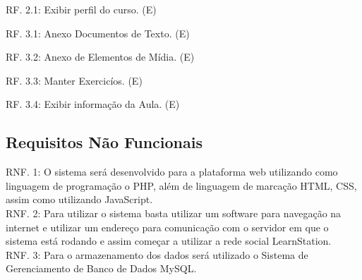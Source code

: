 \documentclass[12pt,a4paper,onecolumn,titlepage]{article}
\begin{document}
RF. 2.1: Exibir perfil do curso. (E)


RF. 3.1: Anexo Documentos de Texto. (E)

RF. 3.2: Anexo de Elementos de Mídia. (E)

RF. 3.3: Manter Exercicíos. (E)

RF. 3.4: Exibir informação da Aula. (E)

\subsection{Requisitos Não Funcionais}

RNF. 1: O sistema será desenvolvido para a plataforma web utilizando como linguagem de programação o PHP, além de linguagem de marcação HTML, CSS, assim como utilizando JavaScript.\\

RNF. 2: Para utilizar o sistema basta utilizar um software para navegação na internet e utilizar um endereço para comunicação com o servidor em que o sistema está rodando e assim começar a utilizar a rede social LearnStation.\\

RNF. 3: Para o armazenamento dos dados será utilizado o Sistema de Gerenciamento de Banco de Dados MySQL.\\


\end{document}

